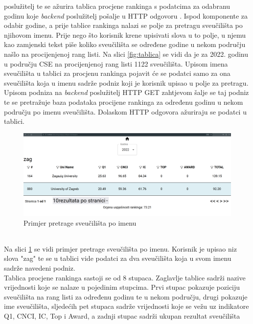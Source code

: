 \documentclass[times, utf8, zavrsni]{fer}
\begin{document}
poslužitelj te se ažurira tablica procjene rankinga s podatcima za odabranu godinu koje \emph{backend} poslužitelj pošalje u HTTP odgovoru .
\newpage Ispod komponente za odabir godine, a prije tablice rankinga
nalazi se polje za pretragu sveučilišta po njihovom imenu. Prije nego što korisnik krene upisivati slova u to polje, u njemu kao zamjenski tekst 
piše koliko sveučilišta se određene godine u nekom području našlo na procijenjenoj rang listi. Na slici \ref{fig:tablica} se vidi da je za 2022. godinu u području CSE 
na procijenjenoj rang listi 1122 sveučilišta.
Upisom imena sveučilišta u tablici za procjenu rankinga pojavit će se podatci samo za ona sveučilišta
koja u imenu sadrže podniz koji je korisnik upisao u polje za pretragu. Upisom podniza na \emph{backend} poslužitelj HTTP GET zahtjevom šalje se taj podniz te se 
pretražuje baza podataka procijene rankinga za određenu godinu u nekom području po imenu sveučilišta. Dolaskom HTTP odgovora ažuriraju se podatci u tablici.\\
\begin{figure}[htb]
    \hspace*{-2cm}  
       \includegraphics[scale=0.21]{search.png} 
       \caption{Primjer pretrage sveučilišta po imenu}
       \label{fig:search}
       \end{figure}
\\Na slici \ref{fig:search} se vidi primjer pretrage sveučilišta po imenu. Korisnik je upisao niz slova "zag" te se u tablici vide podatci za dva sveučilišta
koja u svom imenu sadrže navedeni podniz. 
\\Tablica procjene rankinga sastoji se od 8 stupaca. Zaglavlje tablice sadrži nazive vrijednosti koje se nalaze u pojedinim stupcima.
Prvi stupac pokazuje poziciju sveučilišta na rang listi za određenu godinu te u nekom području, drugi 
pokazuje ime sveučilišta, sljedećih pet stupaca sadrže vrijednosti koje se vežu uz indikatore Q1, CNCI, IC, Top i Award, a zadnji stupac sadrži ukupan rezultat sveučilišta 
\end{document}
